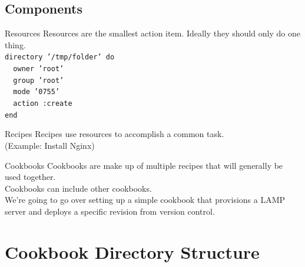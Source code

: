\documentclass{beamer}
\begin{document}
    \subsection{Components}
    \begin{frame}{Resources}
        Resources are the smallest action item.  Ideally they should only do one thing.\\
        \medskip
        \texttt{directory '/tmp/folder' do\\~~owner 'root'\\~~group 'root'\\~~mode '0755'\\~~action :create\\end\\}
    \end{frame}
    \begin{frame}{Recipes}
        Recipes use resources to accomplish a common task.\\(Example: Install Nginx)
    \end{frame}
    \begin{frame}{Cookbooks}
        Cookbooks are make up of multiple recipes that will generally be used together.\\
        Cookbooks can include other cookbooks.\\
        \medskip
        We're going to go over setting up a simple cookbook that provisions a LAMP server and deploys a specific revision from version control.
    \end{frame}

    \section{Cookbook Directory Structure}
\end{document}
